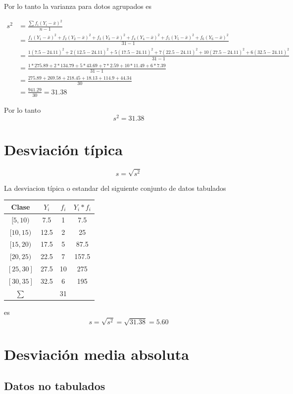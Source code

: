 \documentclass[10pt,]{krantz}
\theoremstyle{definition}
\theoremstyle{definition}
\theoremstyle{definition}
\theoremstyle{definition}
\theoremstyle{remark}
\begin{document}
Por lo tanto la varianza para dotos agrupados es

\[
\begin{aligned}
s^2&=\frac{\sum f_i\left(Y_i-\overline{x}\right )^2}{n-1}\\
&=\frac{f_1\left(Y_1-\overline{x}\right )^2+f_2\left(Y_2-\overline{x}\right )^2+f_3\left(Y_3-\overline{x}\right )^2+f_4\left(Y_4-\overline{x}\right )^2+f_5\left(Y_5-\overline{x}\right )^2+f_6\left(Y_6-\overline{x}\right )^2}{31-1}\\
&=\frac{1\left(7.5-24.11\right )^2+2\left(12.5-24.11\right )^2+5\left(17.5-24.11\right )^2+7\left(22.5-24.11\right )^2+10\left(27.5-24.11\right )^2+6\left(32.5-24.11\right )^2}{31-1}
\\
&=\frac{1*275.89+2*134.79+5*43.69+7*2.59+10*11.49+6*7.39}{31-1}
\\
&=\frac{275.89+269.58+218.45+18.13+114.9+44.34}{30}\\
&=\frac{941.29}{30}=31.38
\end{aligned}
\]

Por lo tanto \[s^2=  31.38\]

\hypertarget{desviaciuxf3n-tuxedpica}{%
\section{Desviación típica}\label{desviaciuxf3n-tuxedpica}}

\[s=\sqrt{s^2}\]

La desviacion típica o estandar del siguiente conjunto de datos tabulados

\begin{longtable}[]{@{}cccc@{}}
\toprule
Clase & \(Y_i\) & \(f_i\) & \(Y_i*f_i\)\tabularnewline
\midrule
\endhead
\([5,10)\) & 7.5 & 1 & 7.5\tabularnewline
\([10,15)\) & 12.5 & 2 & 25\tabularnewline
\([15,20)\) & 17.5 & 5 & 87.5\tabularnewline
\([20,25)\) & 22.5 & 7 & 157.5\tabularnewline
\([25,30]\) & 27.5 & 10 & 275\tabularnewline
\([30,35]\) & 32.5 & 6 & 195\tabularnewline
\(\sum\) & & 31 &\tabularnewline
\bottomrule
\end{longtable}

es
\[s=\sqrt{s^2}=\sqrt{31.38}=5.60\]

\hypertarget{desviaciuxf3n-media-absoluta}{%
\section{Desviación media absoluta}\label{desviaciuxf3n-media-absoluta}}

\hypertarget{datos-no-tabulados-1}{%
\subsection{Datos no tabulados}\label{datos-no-tabulados-1}}
\end{document}
